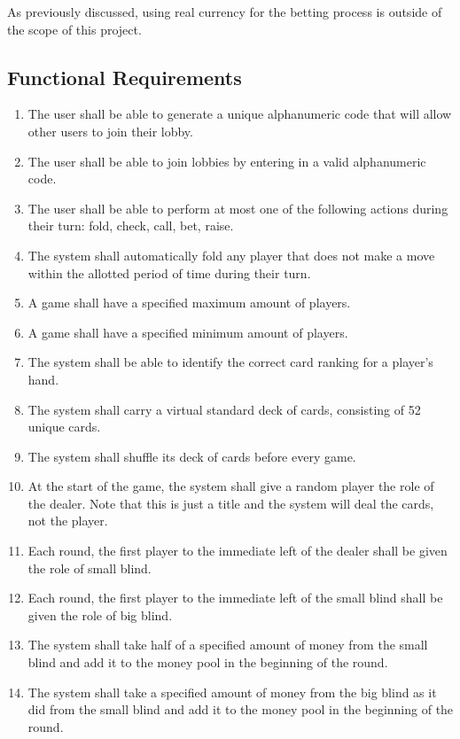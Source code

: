 \documentclass[12pt, titlepage]{article}
\begin{document}
    As previously discussed, using real currency for the betting process is outside of the scope of this project.
    

\subsection{Functional Requirements}
    \begin{enumerate}[label=FR\arabic*.]
        \item The user shall be able to generate a unique alphanumeric code that will allow other users to join their lobby.
        \item The user shall be able to join lobbies by entering in a valid alphanumeric code.
        \item The user shall be able to perform at most one of the following actions during their turn: fold, check, call, bet, raise.
        \item The system shall automatically fold any player that does not make a move within the allotted period of time during their turn.
        \item A game shall have a specified maximum amount of players.
        \item A game shall have a specified minimum amount of players.
        \item The system shall be able to identify the correct card ranking for a player's hand.
        \item The system shall carry a virtual standard deck of cards, consisting of 52 unique cards.
        \item The system shall shuffle its deck of cards before every game.
        \item At the start of the game, the system shall give a random player the role of the dealer. Note that this is just a title and the system will deal the cards, not the player.
        \item Each round, the first player to the immediate left of the dealer shall be given the role of small blind.
        \item Each round, the first player to the immediate left of the small blind shall be given the role of big blind.
        \item The system shall take half of a specified amount of money from the small blind and add it to the money pool in the beginning of the round.
        \item The system shall take a specified amount of money from the big blind as it did from the small blind and add it to the money pool in the beginning of the round.

\end{enumerate}
\end{document}
